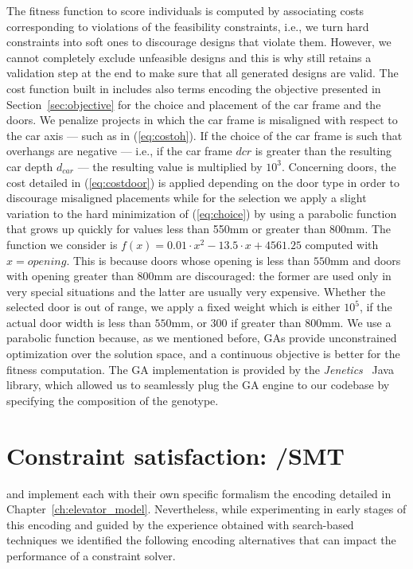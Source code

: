 The fitness function to score individuals is computed by associating
costs corresponding to violations of the feasibility constraints, 
i.e., we turn hard constraints into soft ones to discourage designs 
that violate them. However, we cannot completely exclude unfeasible designs
and this is why \liftcreatega{} still retains a validation step at the
end to make sure that all generated designs are valid. The cost
function built in \liftcreatega{} includes also terms encoding the
objective presented in Section~\ref{sec:objective} for the choice and 
placement of the car frame and the doors.
We penalize projects in which the car frame is misaligned with respect 
to the car axis --- such as in (\ref{eq:costoh}). If the choice of the car 
frame is such that overhangs are negative --- i.e., if the car frame $dcr$ 
is greater than the resulting car depth $d_{car}$ --- the resulting value 
is multiplied by $10^3$.
Concerning doors, the cost detailed in (\ref{eq:costdoor}) is applied depending
on the door type in order to discourage misaligned placements while for the
selection we apply a slight variation to the hard minimization of (\ref{eq:choice})
by using a parabolic function that grows up quickly for values less than 
550mm or greater than 800mm. The function we consider is 
$f(x) = 0.01 \cdot x^2 - 13.5 \cdot x + 4561.25$ computed with  $x = opening$.
This is because doors whose opening is less than $550$mm and doors with opening 
greater than $800$mm are discouraged: the former are used only in very special
situations and the latter are usually very expensive. Whether the selected door 
is out of range, we apply a fixed weight which is either $10^5$, if the actual 
door width is less than $550$mm, or $300$ if greater than $800$mm.
We use a parabolic function because, as we mentioned before, GAs provide
unconstrained optimization over the solution space, and a
continuous objective is better for the fitness computation.
The GA implementation is provided by the \textit{Jenetics}~\cite{jenetics} 
Java library, which allowed us to seamlessly plug the GA engine to our codebase 
by specifying the composition of the genotype. 

\section{Constraint satisfaction: \liftcreatecp{}/\textsc{SMT}}
\label{sec:selection}

\liftcreatecp{} and \liftcreatesmt{} implement each with their own specific
formalism the encoding detailed in Chapter~\ref{ch:elevator_model}.
Nevertheless, while experimenting in early stages of this encoding and
guided by the experience obtained with search-based techniques we 
identified the following encoding alternatives that can impact the performance
of a constraint solver.

